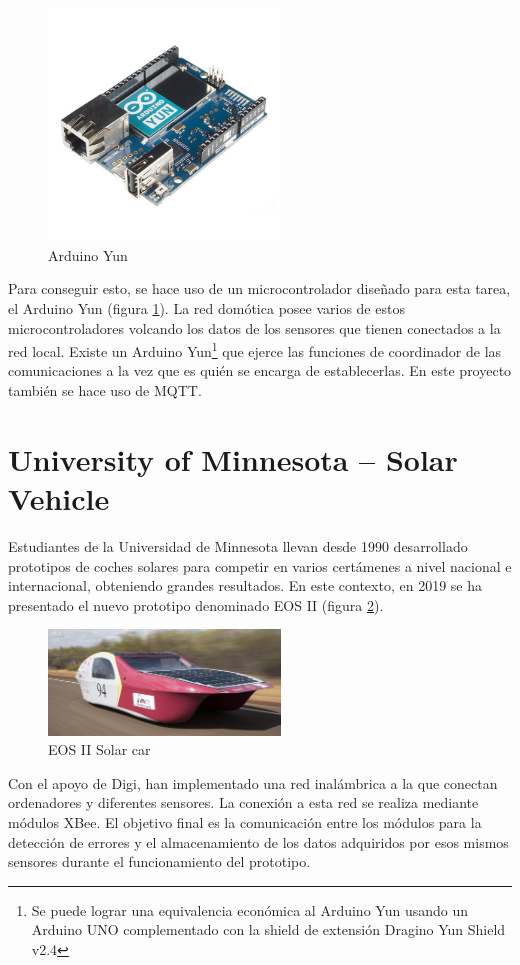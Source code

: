 \begin{figure}[tb]
\centering
\includegraphics[width=0.55\textwidth]{figuras/EArte8.png}
\caption{Arduino Yun}
\label{fig:EArte8}
\end{figure}

Para conseguir esto, se hace uso de un microcontrolador diseñado para esta tarea, el Arduino Yun (figura \ref{fig:EArte8}). La red domótica posee varios de estos microcontroladores volcando los datos de los sensores que tienen conectados a la red local. Existe un Arduino Yun\footnote{Se puede lograr una equivalencia económica al Arduino Yun usando un Arduino UNO complementado con la shield de extensión Dragino Yun Shield v2.4} que ejerce las funciones de coordinador de las comunicaciones a la vez que es quién se encarga de establecerlas. En este proyecto también se hace uso de MQTT.

\section{University of Minnesota – Solar Vehicle \cite{UM:SV}}

Estudiantes de la Universidad de Minnesota llevan desde 1990 desarrollado prototipos de coches solares para competir en varios certámenes a nivel nacional e internacional, obteniendo grandes resultados. En este contexto, en 2019 se ha presentado el nuevo prototipo denominado EOS II (figura \ref{fig:EArte3}). 

\begin{figure}[b]
\centering
\includegraphics[width=0.55\textwidth]{figuras/EArte3.png}
\caption{EOS II Solar car}
\label{fig:EArte3}
\end{figure}

Con el apoyo de Digi, han implementado una red inalámbrica a la que conectan ordenadores y diferentes sensores. La conexión a esta red se realiza mediante módulos XBee. El objetivo final es la comunicación entre los módulos para la detección de errores y el almacenamiento de los datos adquiridos por esos mismos sensores durante el funcionamiento del prototipo.